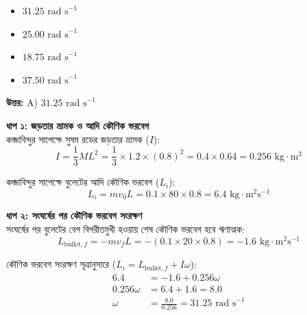 \documentclass[12pt, a4paper]{article}
\begin{document}
\begin{itemize}[label={}, leftmargin=1cm, itemsep=0.5em]
    \item[\textbf{A)}]  $31.25\text{ rad s}^{-1}$
    \item[\textbf{B)}]  $25.00\text{ rad s}^{-1}$
    \item[\textbf{C)}]  $18.75\text{ rad s}^{-1}$
    \item[\textbf{D)}]  $37.50\text{ rad s}^{-1}$
\end{itemize}

\vspace{0.5em}
\begin{tcolorbox}[answerbox]
    \textbf{\color{success} উত্তর:} A) $31.25\text{ rad s}^{-1}$
\end{tcolorbox}
\vspace{1em}

\begin{tcolorbox}[solutionbox={সমাধান (Solution)}]
    \noindent
    \textbf{ধাপ ১: জড়তার ভ্রামক ও আদি কৌণিক ভরবেগ} \\
    কব্জাবিন্দুর সাপেক্ষে সুষম রডের জড়তার ভ্রামক ($I$):
    \[ I = \frac{1}{3} M L^2 = \frac{1}{3} \times 1.2 \times (0.8)^2 = 0.4 \times 0.64 = 0.256\text{ kg}\cdot\text{m}^2 \]
    
    কব্জাবিন্দুর সাপেক্ষে বুলেটের আদি কৌণিক ভরবেগ ($L_i$):
    \[ L_i = m v_0 L = 0.1 \times 80 \times 0.8 = 6.4\text{ kg}\cdot\text{m}^2\text{s}^{-1} \]
    
    \vspace{0.5em}
    \noindent\textbf{ধাপ ২: সংঘর্ষের পর কৌণিক ভরবেগ সংরক্ষণ} \\
    সংঘর্ষের পর বুলেটের বেগ বিপরীতমুখী হওয়ায় শেষ কৌণিক ভরবেগ হবে ঋণাত্মক:
    \[ L_{\text{bullet}, f} = -m v_f L = - (0.1 \times 20 \times 0.8) = -1.6\text{ kg}\cdot\text{m}^2\text{s}^{-1} \]
    
    কৌণিক ভরবেগ সংরক্ষণ সূত্রানুসারে ($L_i = L_{\text{bullet}, f} + I \omega$):
    \begin{align*}
        6.4 &= -1.6 + 0.256 \omega \\
        0.256 \omega &= 6.4 + 1.6 = 8.0 \\
        \omega &= \frac{8.0}{0.256} = \mathbf{31.25}\text{ rad s}^{-1}
    \end{align*}
\end{tcolorbox}
\end{document}
